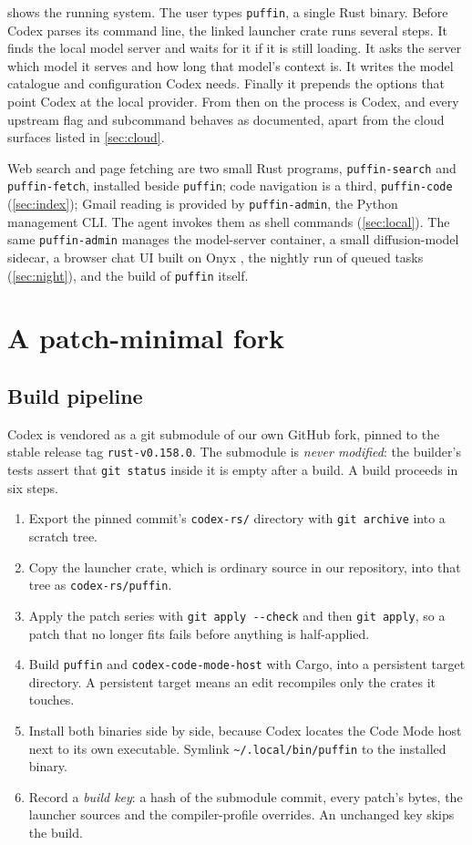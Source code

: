 \documentclass[11pt]{article}
\newcommand{\code}[1]{\texttt{#1}}
\begin{document}
 shows the running system. The user types \code{puffin}, a single Rust binary.
Before Codex parses its command line, the linked launcher crate runs several steps. It finds the
local model server and waits for it if it is still loading. It asks the server which model it serves
and how long that model's context is. It writes the model catalogue and configuration Codex needs.
Finally it prepends the options that point Codex at the local provider. From then on the process is
Codex, and every upstream flag and subcommand behaves as documented, apart from the cloud surfaces
listed in \cref{sec:cloud}.

Web search and page fetching are two small Rust programs, \code{puffin-search} and
\code{puffin-fetch}, installed beside \code{puffin}; code navigation is a third,
\code{puffin-code} (\cref{sec:index}); Gmail reading is provided by
\code{puffin-admin}, the Python management CLI. The agent invokes them as shell commands
(\cref{sec:local}). The same \code{puffin-admin} manages the model-server container, a small
diffusion-model sidecar, a browser chat UI built on Onyx \cite{onyx}, the nightly run of queued
tasks (\cref{sec:night}), and the build of \code{puffin} itself.

\section{A patch-minimal fork}
\label{sec:fork}

\subsection{Build pipeline}

Codex is vendored as a git submodule of our own GitHub fork, pinned to the stable release tag
\code{rust-v0.158.0}. The submodule is \emph{never modified}: the builder's tests assert that
\code{git status} inside it is empty after a build. A build proceeds in six steps.
\begin{enumerate}
  \item Export the pinned commit's \code{codex-rs/} directory with \code{git archive} into a scratch
    tree.
  \item Copy the launcher crate, which is ordinary source in our repository, into that tree as
    \code{codex-rs/puffin}.
  \item Apply the patch series with \code{git apply -{}-check} and then \code{git apply}, so a patch
    that no longer fits fails before anything is half-applied.
  \item Build \code{puffin} and \code{codex-code-mode-host} with Cargo, into a persistent target
    directory. A persistent target means an edit recompiles only the crates it touches.
  \item Install both binaries side by side, because Codex locates the Code Mode host next to its own
    executable. Symlink \code{\textasciitilde/.local/bin/puffin} to the installed binary.
  \item Record a \emph{build key}: a hash of the submodule commit, every patch's bytes, the launcher
    sources and the compiler-profile overrides. An unchanged key skips the build.
\end{enumerate}
\end{document}
